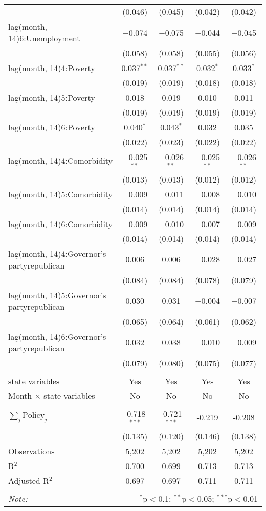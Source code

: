 \begin{tabular}{@{\extracolsep{1pt}}lcccc}
  & (0.046) & (0.045) & (0.042) & (0.042) \\ 
  lag(month, 14)6:Unemployment & $-$0.074 & $-$0.075 & $-$0.044 & $-$0.045 \\ 
  & (0.058) & (0.058) & (0.055) & (0.056) \\ 
  lag(month, 14)4:Poverty & 0.037$^{**}$ & 0.037$^{**}$ & 0.032$^{*}$ & 0.033$^{*}$ \\ 
  & (0.019) & (0.019) & (0.018) & (0.018) \\ 
  lag(month, 14)5:Poverty & 0.018 & 0.019 & 0.010 & 0.011 \\ 
  & (0.019) & (0.019) & (0.019) & (0.019) \\ 
  lag(month, 14)6:Poverty & 0.040$^{*}$ & 0.043$^{*}$ & 0.032 & 0.035 \\ 
  & (0.022) & (0.023) & (0.022) & (0.022) \\ 
  lag(month, 14)4:Comorbidity & $-$0.025$^{**}$ & $-$0.026$^{**}$ & $-$0.025$^{**}$ & $-$0.026$^{**}$ \\ 
  & (0.013) & (0.013) & (0.012) & (0.012) \\ 
  lag(month, 14)5:Comorbidity & $-$0.009 & $-$0.011 & $-$0.008 & $-$0.010 \\ 
  & (0.014) & (0.014) & (0.014) & (0.014) \\ 
  lag(month, 14)6:Comorbidity & $-$0.009 & $-$0.010 & $-$0.007 & $-$0.009 \\ 
  & (0.014) & (0.014) & (0.014) & (0.014) \\ 
  lag(month, 14)4:Governor's partyrepublican & 0.006 & 0.006 & $-$0.028 & $-$0.027 \\ 
  & (0.084) & (0.084) & (0.078) & (0.079) \\ 
  lag(month, 14)5:Governor's partyrepublican & 0.030 & 0.031 & $-$0.004 & $-$0.007 \\ 
  & (0.065) & (0.064) & (0.061) & (0.062) \\ 
  lag(month, 14)6:Governor's partyrepublican & 0.032 & 0.038 & $-$0.010 & $-$0.009 \\ 
  & (0.079) & (0.080) & (0.075) & (0.077) \\ 
 \hline \\[-1.8ex] 
state variables & Yes & Yes & Yes & Yes \\ 
Month $\times$ state variables & No & No & No & No \\ 
\hline \\[-1.8ex] 
$\sum_j \mathrm{Policy}_j$ & -0.718$^{***}$ & -0.721$^{***}$ & -0.219 & -0.208 \\ 
 & (0.135) & (0.120) & (0.146) & (0.138) \\ 
Observations & 5,202 & 5,202 & 5,202 & 5,202 \\ 
R$^{2}$ & 0.700 & 0.699 & 0.713 & 0.713 \\ 
Adjusted R$^{2}$ & 0.697 & 0.697 & 0.711 & 0.711 \\ 
\hline 
\hline \\[-1.8ex] 
\textit{Note:}  & \multicolumn{4}{r}{$^{*}$p$<$0.1; $^{**}$p$<$0.05; $^{***}$p$<$0.01} \\ 
\end{tabular} 